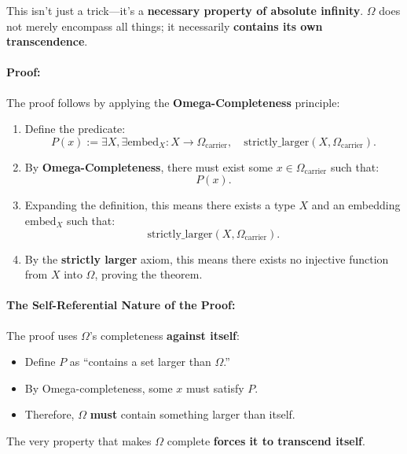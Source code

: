 \documentclass[12pt]{article}
\begin{document}
This isn't just a trick—it's a \textbf{necessary property of absolute infinity}. \( \Omega \) does not merely encompass all things; it necessarily \textbf{contains its own transcendence}.

\paragraph{Proof:}
The proof follows by applying the \textbf{Omega-Completeness} principle:

\begin{enumerate}
    \item Define the predicate:
    \[
    P(x) := \exists X, \exists \text{embed}_X: X \to \Omega_{\text{carrier}}, \quad \text{strictly\_larger}(X, \Omega_{\text{carrier}}).
    \]
    \item By \textbf{Omega-Completeness}, there must exist some \( x \in \Omega_{\text{carrier}} \) such that:
    \[
    P(x).
    \]
    \item Expanding the definition, this means there exists a type \( X \) and an embedding \( \text{embed}_X \) such that:
    \[
    \text{strictly\_larger}(X, \Omega_{\text{carrier}}).
    \]
    \item By the \textbf{strictly larger} axiom, this means there exists no injective function from \( X \) into \( \Omega \), proving the theorem.
\end{enumerate}

\paragraph{The Self-Referential Nature of the Proof:}
The proof uses \( \Omega \)'s completeness \textbf{against itself}:
\begin{itemize}
    \item Define \( P \) as “contains a set larger than \( \Omega \).”
    \item By Omega-completeness, some \( x \) must satisfy \( P \).
    \item Therefore, \( \Omega \) \textbf{must} contain something larger than itself.
\end{itemize}

The very property that makes \( \Omega \) complete \textbf{forces it to transcend itself}.
\end{document}
